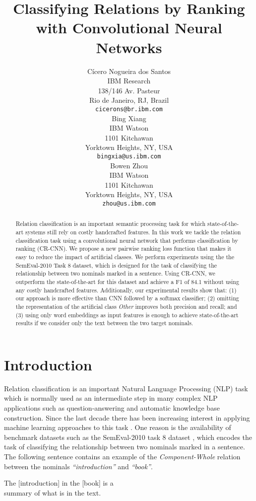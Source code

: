 \documentclass[11pt]{article}
\title{Classifying Relations by Ranking with Convolutional Neural Networks}
\author{C\'{i}cero Nogueira dos Santos \\
  IBM Research \\
  138/146 Av. Pasteur \\
  Rio de Janeiro, RJ, Brazil \\
  {\tt cicerons@br.ibm.com} \\\And
  Bing Xiang \\
  IBM Watson \\
  1101 Kitchawan  \\
  Yorktown Heights, NY, USA \\
  {\tt bingxia@us.ibm.com} \\\And
  Bowen Zhou \\
  IBM Watson \\
  1101 Kitchawan \\
  Yorktown Heights, NY, USA \\
  {\tt zhou@us.ibm.com}
  \\}
\date{}
\begin{document}
\maketitle
\begin{abstract}
Relation classification is an important semantic processing task for which state-of-the-art systems still rely on costly handcrafted features.
In this work we tackle the relation classification task using a convolutional neural network that performs classification by ranking (CR-CNN).
We propose a new pairwise ranking loss function that makes it easy to reduce the impact of artificial classes.
We perform experiments using the the SemEval-2010 Task 8 dataset,
which is designed for the task of classifying the relationship between two nominals marked in a sentence.
Using CR-CNN,
we outperform the state-of-the-art for this dataset and achieve a F1 of 84.1 without using any costly handcrafted features.
Additionally, our experimental results show that: (1) our approach is more effective than CNN followed by a softmax classifier;
(2) omitting the representation of the artificial class \emph{Other} improves both precision and recall; and 
(3) using only word embeddings as input features is enough to achieve state-of-the-art results if we consider only the text between the two target nominals.
\end{abstract}



\section{Introduction}
\label{sec:intro}
Relation classification is an important Natural Language Processing (NLP) task which is normally used as an intermediate step in many complex NLP applications such as question-answering and automatic knowledge base construction.
Since the last decade there has been increasing interest in applying machine learning approaches to this task \cite{zhang2004:cikm,qian2009:SLS,rink:2010}.
One reason is the availability of benchmark datasets such as the SemEval-2010 task 8 dataset \cite{hendrickx2010:semeval},
which encodes the task of classifying the relationship between two nominals marked in a sentence. The following sentence contains an example of the \emph{Component-Whole} relation between the nominals \emph{``introduction''} and \emph{``book''}.

\begin{center}
\begin{small}
The [introduction] in the [book] is a \\
summary of what is in the text.
\end{small}
\end{center}
\end{document}
